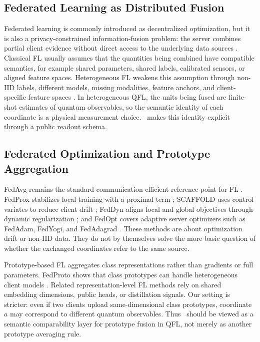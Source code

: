 \subsection{Federated Learning as Distributed Fusion}

Federated learning is commonly introduced as decentralized optimization, but it is also a privacy-constrained information-fusion problem: the server combines partial client evidence without direct access to the underlying data sources \cite{yang2019federated,kairouz2021advances}. Classical FL usually assumes that the quantities being combined have compatible semantics, for example shared parameters, shared labels, calibrated sensors, or aligned feature spaces. Heterogeneous FL weakens this assumption through non-IID labels, different models, missing modalities, feature anchors, and client-specific feature spaces \cite{li2020fedprox,karimireddy2020scaffold,acar2021feddyn,reddi2021fedopt,rakotomamonjy2024flic,zhou2024fedfa}. In heterogeneous QFL, the units being fused are finite-shot estimates of quantum observables, so the semantic identity of each coordinate is a physical measurement choice. \method\ makes this identity explicit through a public readout schema.

\subsection{Federated Optimization and Prototype Aggregation}

FedAvg remains the standard communication-efficient reference point for FL \cite{mcmahan2017fedavg}. FedProx stabilizes local training with a proximal term \cite{li2020fedprox}; SCAFFOLD uses control variates to reduce client drift \cite{karimireddy2020scaffold}; FedDyn aligns local and global objectives through dynamic regularization \cite{acar2021feddyn}; and FedOpt covers adaptive server optimizers such as FedAdam, FedYogi, and FedAdagrad \cite{reddi2021fedopt}. These methods are about optimization drift or non-IID data. They do not by themselves solve the more basic question of whether the exchanged coordinates refer to the same source.

Prototype-based FL aggregates class representations rather than gradients or full parameters. FedProto shows that class prototypes can handle heterogeneous client models \cite{tan2022fedproto}. Related representation-level FL methods rely on shared embedding dimensions, public heads, or distillation signals. Our setting is stricter: even if two clients upload same-dimensional class prototypes, coordinate \(a\) may correspond to different quantum observables. Thus \method\ should be viewed as a semantic comparability layer for prototype fusion in QFL, not merely as another prototype averaging rule.

